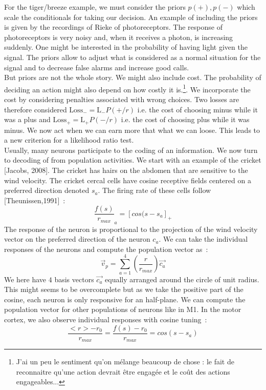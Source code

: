 \documentclass[10pt,a4paper]{article}
\begin{document}
For the tiger/breeze example, we must consider the priors $p(+), p(-)$
which scale the conditionals for taking our decision. An example of
including the priors is given by the recordings of Rieke of
photoreceptors. The response of photoreceptors is very noisy and, when
it receives a photon, is increasing suddenly. One might be interested
in the probability of having light given the signal. The priors allow
to adjust what is considered as a normal situation for the signal and
to decrease false alarms and increase good calls.\\

But priors are not the whole story. We might also include cost. The
probability of deciding an action might also depend on how costly it
is.\footnote{J'ai un peu le sentiment qu'on mélange beaucoup de chose
  : le fait de reconnaitre qu'une action devrait être engagée et le
  coût des actions engageables...}. We incorporate the cost by
considering penalties associated with wrong choices. Two losses are
therefore considered $\mbox{Loss}_- = \mbox{L}_- P(+/r)$ i.e. the cost
of choosing minus while it was a plus and $\mbox{Loss}_+ = \mbox{L}_+
P(-/r)$ i.e. the cost of choosing plus while it was minus. We now act
when we can earn more that what we can loose.  This leads to a new
criterion for a likelihood ratio test.\\

Usually, many neurons participate to the coding of an information. We
now turn to decoding of from population activities. We start with an
example of the cricket [Jacobs, 2008]. The cricket has hairs on the
abdomen that are sensitive to the wind velocity. The cricket cercal
cells have cosine receptive fields centered on a preferred direction
denoted $s_a$. The firing rate of these cells follow [Theunissen,1991]~:
\begin{equation}
\frac{f(s)}{r_{max}}_a = [cos(s - s_a]_+
\end{equation}
The response of the neuron is proportional to the projection of the
wind velocity vector on the preferred direction of the neuron $c_a$. We can
take the individual responses of the neurons and compute the
population vector as~:
\begin{equation}
\vec{v}_p = \sum_{a=1}^{4} (\frac{r}{r_{max}}) \vec{c_a}
\end{equation}
We here have $4$ basis vectors $\vec{c_a}$ equally arranged around the circle of
unit radius. This might seems to be overcomplete but as we take the
positive part of the cosine, each neuron is only responsive for an
half-plane. We can compute the population vector for other populations
of neurons like in M1. In the motor cortex, we also observe individual
responses with cosine tuning~:
\begin{equation}
\frac{<r> - r_0}{r_{max}} = \frac{f(s) - r_0}{r_{max}} = cos(s - s_a)
\end{equation}
\end{document}
